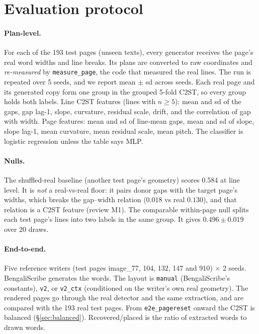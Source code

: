 \documentclass[11pt,a4paper]{article}
\begin{document}
\section{Evaluation protocol}
\label{sec:protocol}

\paragraph{Plan-level.} For each of the 193 test pages (unseen texts), every
generator receives the page's real word widths and line breaks. Its plans are
converted to raw coordinates and \emph{re-measured} by
\texttt{measure\_page}, the code that measured the real lines. The run is
repeated over 5 seeds, and we report mean $\pm$ sd across seeds. Each real page
and its generated copy form one group in the grouped 5-fold C2ST, so every
group holds both labels. Line C2ST features (lines with $n\ge5$): mean and sd
of the gaps, gap lag-1, slope, curvature, residual scale, drift, and the
correlation of gap with width. Page features: mean and sd of line-mean gaps,
mean and sd of slope, slope lag-1, mean curvature, mean residual scale, mean
pitch. The classifier is logistic regression unless the table says MLP.

\paragraph{Nulls.} The shuffled-real baseline (another test page's geometry)
scores 0.584 at line level. It is \emph{not} a real-vs-real floor: it pairs
donor gaps with the target page's widths, which breaks the gap--width relation
($0.018$ vs real $0.130$), and that relation is a C2ST feature (review M1). The
comparable within-page null splits each test page's lines into two labels in
the same group. It gives $0.496\pm0.019$ over 20 draws.

\paragraph{End-to-end.} Five reference writers (test pages image\_77, 104,
132, 147 and 910) $\times$ 2 seeds. BengaliScribe generates the words. The
layout is \texttt{manual} (BengaliScribe's constants), \texttt{v2}, or
\texttt{v2\_ctx} (conditioned on the writer's own real geometry). The rendered
pages go through the real detector and the same extraction, and are compared
with the 193 real test pages. From \texttt{e2e\_pagereset} onward the C2ST is
balanced (\S\ref{sec:balanced}). Recovered/placed is the ratio of extracted
words to drawn words.
\end{document}
